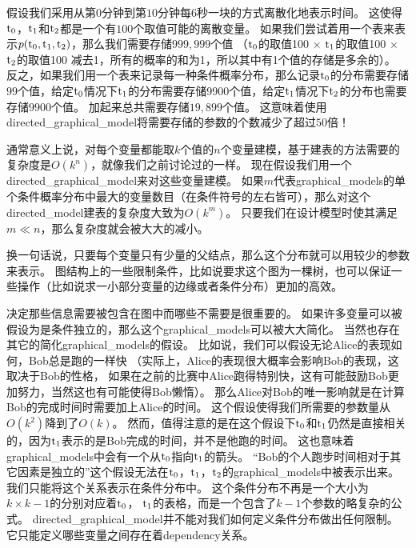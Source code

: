 假设我们采用从第$0$分钟到第$10$分钟每$6$秒一块的方式离散化地表示时间。
这使得$\mathrm{t}_0$，$\mathrm{t}_1$和$\mathrm{t}_2$都是一个有$100$个取值可能的离散变量。
如果我们尝试着用一个表来表示$p(\mathrm{t}_0,\mathrm{t}_1,\mathrm{t}_2)$，那么我们需要存储$999,999$个值
（$\mathrm{t}_0$的取值100 $\times$ $\mathrm{t}_1$的取值100 $\times$ $\mathrm{t}_2$的取值100 减去1，所有的概率的和为1，所以其中有1个值的存储是多余的）。
反之，如果我们用一个表来记录每一种条件概率分布，那么记录$\mathrm{t}_0$的分布需要存储$99$个值，给定$\mathrm{t}_0$情况下$\mathrm{t}_1$的分布需要存储9900个值，给定$\mathrm{t}_1$情况下$\mathrm{t}_2$的分布也需要存储$9900$个值。
加起来总共需要存储$19, 899$个值。
这意味着使用\gls{directed_graphical_model}将需要存储的参数的个数减少了超过$50$倍！


通常意义上说，对每个变量都能取$k$个值的$n$个变量建模，基于建表的方法需要的复杂度是$O(k^n)$，就像我们之前讨论过的一样。
现在假设我们用一个\gls{directed_graphical_model}来对这些变量建模。
如果$m$代表\gls{graphical_models}的单个条件概率分布中最大的变量数目（在条件符号的左右皆可），那么对这个\gls{directed_model}建表的复杂度大致为$O(k^m)$。
只要我们在设计模型时使其满足$m\ll n$，那么复杂度就会被大大的减小。


换一句话说，只要每个变量只有少量的父结点，那么这个分布就可以用较少的参数来表示。
图结构上的一些限制条件，比如说要求这个图为一棵树，也可以保证一些操作（比如说求一小部分变量的边缘或者条件分布）更加的高效。



决定那些信息需要被包含在图中而哪些不需要是很重要的。
如果许多变量可以被假设为是条件独立的，那么这个\gls{graphical_models}可以被大大简化。
当然也存在其它的简化\gls{graphical_models}的假设。
比如说，我们可以假设无论Alice的表现如何，Bob总是跑的一样快
（实际上，Alice的表现很大概率会影响Bob的表现，这取决于Bob的性格，
如果在之前的比赛中Alice跑得特别快，这有可能鼓励Bob更加努力，当然这也有可能使得Bob懒惰）。
那么Alice对Bob的唯一影响就是在计算Bob的完成时间时需要加上Alice的时间。
这个假设使得我们所需要的参数量从$O(k^2)$降到了$O(k)$。
然而，值得注意的是在这个假设下$\mathrm{t}_0$和$\mathrm{t}_1$仍然是直接相关的，因为$\mathrm{t}_1$表示的是Bob完成的时间，并不是他跑的时间。
这也意味着\gls{graphical_models}中会有一个从$\mathrm{t}_0$指向$\mathrm{t}_1$的箭头。
``Bob的个人跑步时间相对于其它因素是独立的''这个假设无法在$\mathrm{t}_0$，$\mathrm{t}_1$，$\mathrm{t}_2$的\gls{graphical_models}中被表示出来。
我们只能将这个关系表示在条件分布中。
这个条件分布不再是一个大小为$k\times k-1$的分别对应着$\mathrm{t}_0$，  $\mathrm{t}_1$的表格，而是一个包含了$k-1$个参数的略复杂的公式。
\gls{directed_graphical_model}并不能对我们如何定义条件分布做出任何限制。
它只能定义哪些变量之间存在着\gls{dependency}关系。



